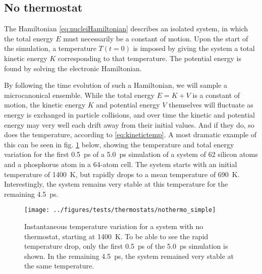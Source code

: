 \documentclass[11pt,bibliography=totoc,index=totoc]{scrbook}   %
\newcommand{\comment}[1]{\hl{#1}}
\begin{document}
%
\subsection{No thermostat}\label{sec:nothermo}
%

The Hamiltonian \eqref{eq:nucleiHamiltonian} describes an isolated system, in which the total energy $E$ must necessarily be a constant of motion.
Upon the start of the simulation, a temperature $T(t=0)$ is imposed by giving the system a total kinetic energy $K$ corresponding to that temperature. 
The potential energy is found by solving the electronic Hamiltonian.

By following the time evolution of such a Hamiltonian, we will sample a microcanonical ensemble. 
While the total energy $E=K+V$ is a constant of motion, the kinetic energy $K$ and potential energy $V$ themselves will fluctuate as energy is exchanged in particle collisions, and over time the kinetic and potential energy may very well each drift away from their initial values.
And if they do, so does the temperature, according to \eqref{eq:kinetictemp}. 
A most dramatic example of this can be seen in fig. \ref{fig:md_test_temperature_micro} below, showing the temperature and total energy variation for the first 0.5~ps of a 5.0~ps simulation of a system of 62 silicon atoms and a phosphorus atom in a 64-atom cell. 
The system starts with an initial temperature of 1400~K, but rapidly drops to a mean temperature of 690~K.
Interestingly, the system remains very stable at this temperature for the remaining 4.5~ps.

\begin{figure}[htbp]
  \centering
  \texttt{[image: ../figures/tests/thermostats/nothermo\_simple]}
  \caption{
    Instantaneous temperature variation for a system with no thermostat, starting at 1400~K.
    To be able to see the rapid temperature drop, only the first 0.5~ps of the 5.0~ps simulation is shown.
    In the remaining 4.5~ps, the system remained very stable at the same temperature.
  }
  \label{fig:md_test_temperature_micro}
\end{figure}
\end{document}
